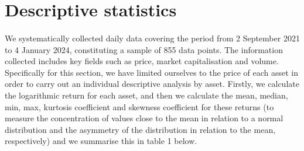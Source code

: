 \documentclass{article}
\begin{document}
\section{Descriptive statistics}\label{sec:descstats}

\paragraph{}
We systematically collected daily data covering the period from 2 September 2021 to 4 January 2024, constituting a sample of 855 data points. The information collected includes key fields such as price, market capitalisation and volume.
Specifically for this section, we have limited ourselves to the price of each asset in order to carry out an individual descriptive analysis by asset.
Firstly, we calculate the logarithmic return for each asset, and then we calculate the mean, median, min, max, kurtosis coefficient and skewness coefficient for these returns (to measure the concentration of values close to the mean in relation to a normal distribution and the asymmetry of the distribution in relation to the mean, respectively) and we summarise this in table 1 below.
\end{document}
